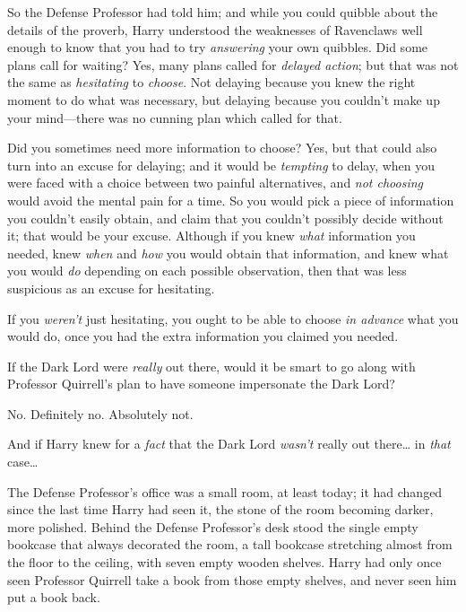 
 

\hplettrineextrapara
So the Defense Professor had told him; and while you could quibble about the details of the proverb, Harry understood the weaknesses of Ravenclaws well enough to know that you had to try \emph{answering} your own quibbles. Did some plans call for waiting? Yes, many plans called for \emph{delayed action}; but that was not the same as \emph{hesitating} to \emph{choose}. Not delaying because you knew the right moment to do what was necessary, but delaying because you couldn't make up your mind---there was no cunning plan which called for that.

Did you sometimes need more information to choose? Yes, but that could also turn into an excuse for delaying; and it would be \emph{tempting} to delay, when you were faced with a choice between two painful alternatives, and \emph{not choosing} would avoid the mental pain for a time. So you would pick a piece of information you couldn't easily obtain, and claim that you couldn't possibly decide without it; that would be your excuse. Although if you knew \emph{what} information you needed, knew \emph{when} and \emph{how} you would obtain that information, and knew what you would \emph{do} depending on each possible observation, then that was less suspicious as an excuse for hesitating.

If you \emph{weren't} just hesitating, you ought to be able to choose \emph{in advance} what you would do, once you had the extra information you claimed you needed.

If the Dark Lord were \emph{really} out there, would it be smart to go along with Professor Quirrell's plan to have someone impersonate the Dark Lord?

No. Definitely no. Absolutely not.

And if Harry knew for a \emph{fact} that the Dark Lord \emph{wasn't} really out there{\ldots} in \emph{that} case{\ldots}

The Defense Professor's office was a small room, at least today; it had changed since the last time Harry had seen it, the stone of the room becoming darker, more polished. Behind the Defense Professor's desk stood the single empty bookcase that always decorated the room, a tall bookcase stretching almost from the floor to the ceiling, with seven empty wooden shelves. Harry had only once seen Professor Quirrell take a book from those empty shelves, and never seen him put a book back.

